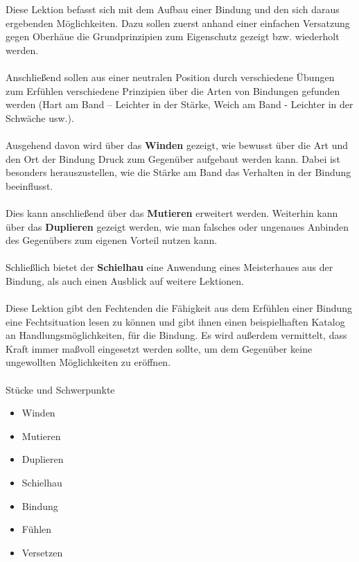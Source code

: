 Diese Lektion befasst sich mit dem Aufbau einer Bindung und den sich daraus ergebenden Möglichkeiten.
Dazu sollen zuerst anhand einer einfachen Versatzung gegen Oberhäue die Grundprinzipien zum Eigenschutz gezeigt bzw. wiederholt werden.
\\
\\
Anschließend sollen aus einer neutralen Position durch verschiedene Übungen zum Erfühlen verschiedene Prinzipien über die Arten von Bindungen gefunden werden (Hart am Band – Leichter in der Stärke, Weich am Band - Leichter in der Schwäche usw.).
\\
\\
Ausgehend davon wird über das \textbf{Winden} gezeigt, wie bewusst über die Art und den Ort der Bindung Druck zum Gegenüber aufgebaut werden kann.
Dabei ist besonders herauszustellen, wie die Stärke am Band das Verhalten in der Bindung beeinflusst.
\\
\\
Dies kann anschließend über das \textbf{Mutieren} erweitert werden.
Weiterhin kann über das \textbf{Duplieren} gezeigt werden, wie man falsches oder ungenaues Anbinden des Gegenübers zum eigenen Vorteil nutzen kann.
\\
\\
Schließlich bietet der \textbf{Schielhau} eine Anwendung eines Meisterhaues aus der Bindung, als auch einen Ausblick auf weitere Lektionen.
\\
\\
Diese Lektion gibt den Fechtenden die Fähigkeit aus dem Erfühlen einer Bindung eine Fechtsituation lesen zu können und gibt ihnen einen beispielhaften Katalog an Handlungsmöglichkeiten, für die Bindung.
Es wird außerdem vermittelt, dass Kraft immer maßvoll eingesetzt werden sollte, um dem Gegenüber keine ungewollten Möglichkeiten zu eröffnen.
\\
\\
Stücke und Schwerpunkte

\begin{itemize}
    \item Winden
    \item Mutieren
    \item Duplieren
    \item Schielhau
\end{itemize}

\hspace{0.5cm}

\begin{itemize}
    \item Bindung
    \item Fühlen
    \item Versetzen
\end{itemize}

